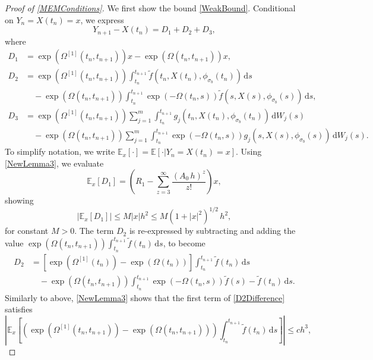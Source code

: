 \documentclass[onefignum]{siamart250211}
\providecommand{\abs}[1]{\left|#1\right|}
\begin{document}
\begin{proof}[Proof of \cref{MEMConditions}]
We first show the bound \cref{WeakBound}. Conditional on $Y_n=X(t_n)=x$, we express
\begin{equation}Y_{n+1}-X(t_n)=D_1+D_2+D_3,\label{DifferenceExpanded}\end{equation}
where
\begin{align*}
D_1&=\exp\left(\Omega^{[1]}(t_n,t_{n+1})\right)x-\exp\left(\Omega(t_n,t_{n+1})\right)x,\\
D_2&=\exp\left(\Omega^{[1]}(t_n,t_{n+1})\right)\int_{t_n}^{t_{n+1}}\tilde{f}(t_n,X(t_n),\phi_{\sigma_b}(t_n))\,\mathrm{d}s\\
&\quad-\exp\left(\Omega(t_n,t_{n+1})\right)\int_{t_n}^{t_{n+1}}\exp\left(-\Omega(t_n,s)\right)\tilde{f}(s,X(s),\phi_{\sigma_b}(s))\,\mathrm{d}s,\\
D_3&=\exp\left(\Omega^{[1]}(t_n,t_{n+1})\right)\sum_{j=1}^m\int_{t_n}^{t_{n+1}}g_j(t_n,X(t_n),\phi_{\sigma_b}(t_n))\,\mathrm{d}W_j(s)\\
&\quad-\exp\left(\Omega(t_n,t_{n+1})\right)\sum_{j=1}^m\int_{t_n}^{t_{n+1}}\exp\left(-\Omega(t_n,s)\right)g_j(s,X(s),\phi_{\sigma_b}(s))\,\mathrm{d}W_j(s).
\end{align*}
To simplify notation, we write $\mathbb{E}_x[\cdot]=\mathbb{E}[\cdot|Y_n=X(t_n)=x]$. Using \cref{NewLemma3}, we evaluate
\begin{equation*}
\mathbb{E}_x[D_1]=\left(R_1-\sum_{z=3}^\infty\frac{(A_0\,h)^z}{z!}\right)x,
\end{equation*}
showing
\begin{equation}\abs{\mathbb{E}_x[D_1]}\leqslant M\abs{x}h^2\leqslant M\left(1+\abs{x}^2\right)^{1/2}\,h^2,\label{D1WeakMEM}\end{equation}
for constant $M>0$. The term $D_2$ is re-expressed by subtracting and adding the value $\exp(\Omega(t_n,t_{n+1}))\int_{t_n}^{t_{n+1}}\tilde{f}(t_n)\,\mathrm{d}s$, to become
\begin{align}
D_2&=\left[\exp(\Omega^{[1]}(t_n))-\exp(\Omega(t_n))\right]\int_{t_n}^{t_{n+1}}\tilde{f}(t_n)\,\mathrm{d}s\label{D2Difference}\\
&\quad-\exp(\Omega(t_n,t_{n+1}))\int_{t_n}^{t_{n+1}}\exp(-\Omega(t_n,s))\tilde{f}(s)-\tilde{f}(t_n)\,\mathrm{d}s.
\end{align}
Similarly to above, \cref{NewLemma3} shows that the first term of \cref{D2Difference} satisfies
\begin{equation*}
\abs{\mathbb{E}_x\left[\left(\exp\left(\Omega^{[1]}(t_n,t_{n+1})\right)-\exp(\Omega(t_n,t_{n+1}))\right)\int_{t_n}^{t_{n+1}}\tilde{f}(t_n)\,\mathrm{d}s\right]}\leqslant ch^3,

\end{equation*}
\end{proof}
\end{document}
